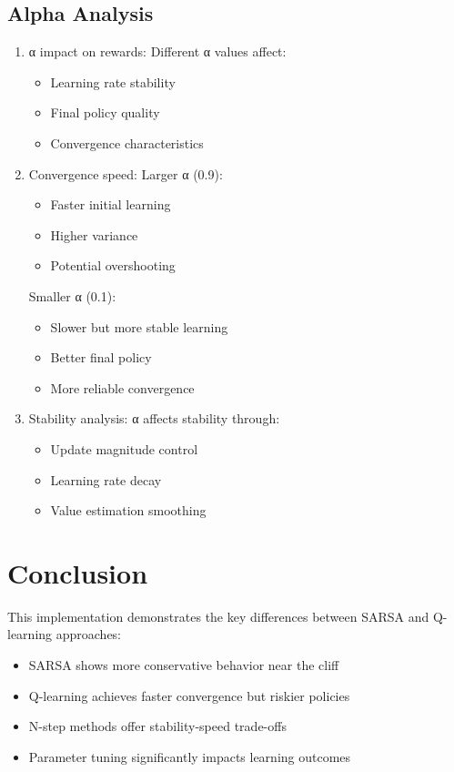 \documentclass{article}
\begin{document}
\subsection{Alpha Analysis}
\begin{enumerate}[label=(\arabic*)]
\item α impact on rewards:
Different α values affect:
\begin{itemize}
    \item Learning rate stability
    \item Final policy quality
    \item Convergence characteristics
\end{itemize}

\item Convergence speed:
Larger α (0.9):
\begin{itemize}
    \item Faster initial learning
    \item Higher variance
    \item Potential overshooting
\end{itemize}

Smaller α (0.1):
\begin{itemize}
    \item Slower but more stable learning
    \item Better final policy
    \item More reliable convergence
\end{itemize}

\item Stability analysis:
α affects stability through:
\begin{itemize}
    \item Update magnitude control
    \item Learning rate decay
    \item Value estimation smoothing
\end{itemize}
\end{enumerate}

\section{Conclusion}
This implementation demonstrates the key differences between SARSA and Q-learning approaches:
\begin{itemize}
    \item SARSA shows more conservative behavior near the cliff
    \item Q-learning achieves faster convergence but riskier policies
    \item N-step methods offer stability-speed trade-offs
    \item Parameter tuning significantly impacts learning outcomes
\end{itemize}
\end{document}
